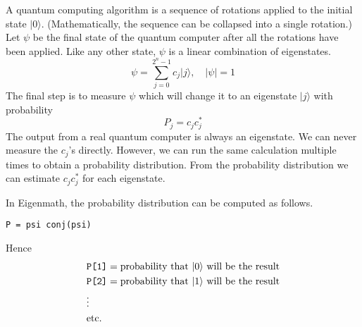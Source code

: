 \noindent
A quantum computing algorithm is a sequence of rotations
applied to the initial state $|0\rangle$.
(Mathematically, the sequence can be collapsed into a single rotation.)
Let $\psi$ be the final state of the quantum computer
after all the rotations have been applied.
Like any other state, $\psi$ is a linear combination of eigenstates.
\begin{equation*}
\psi=\sum_{j=0}^{2^n-1}c_j|j\rangle,\quad|\psi|=1
\end{equation*}
The final step is to measure $\psi$ which will
change it to an eigenstate $|j\rangle$ with
probability
\begin{equation*}
P_j=c_jc_j^*
\end{equation*}
The output from a real quantum computer is always an eigenstate.
We can never measure the $c_j$'s directly.
However, we can run the same calculation multiple times
to obtain a probability distribution.
From the probability distribution we can estimate
$c_jc_j^*$ for each eigenstate.

\bigskip
\noindent
In Eigenmath, the probability distribution can be computed as follows.
\begin{center}
\tt P = psi conj(psi)
\end{center}

\noindent
Hence
\begin{align*}
&\text{\tt P[1]}=\text{probability that $|0\rangle$ will be the result}
\\
&\text{\tt P[2]}=\text{probability that $|1\rangle$ will be the result}
\\
&\vdots
\\
&\text{etc.}
\end{align*}

